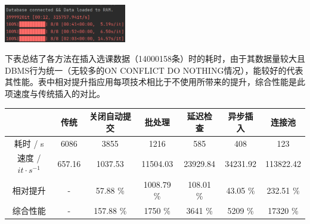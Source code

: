 \centerline{\includegraphics[width=0.4\textwidth]{pic/pkg50w.png}}

下表总结了各方法在插入选课数据（14000158条）时的耗时，由于其数据量较大且DBMS行为统一（无较多的ON CONFLICT DO NOTHING情况），能较好的代表其性能。表中相对提升指应用每项技术相比于不使用所带来的提升，综合性能是此项速度与传统插入的对比。
\begin{table}[H]
\centering
\begin{tabular}{|c|c|c|c|c|c|c|}
\hline
                      & 传统     & 关闭自动提交    & 批处理        & 延迟检查      & 异步插入     & 连接池       \\ \hline
耗时 / s                & 6086   & 3855      & 1216       & 585       & 408      & 123       \\ \hline
速度 / $it\cdot s^{-1}$ & 657.16 & 1037.53   & 11504.03   & 23929.84  & 34231.92 & 113822.42 \\ \hline
相对提升                  & -      & 57.88 \%  & 1008.79 \% & 108.01 \% & 43.05 \% & 232.51 \% \\ \hline
综合性能                  & -      & 157.88 \% & 1750 \%    & 3641 \%   & 5209 \%  & 17320 \%  \\ \hline
\end{tabular}
\end{table}
